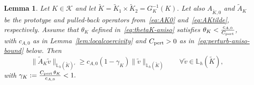 \documentclass[a4paper,twoside,10pt]{article}
\newtheorem{lemma}[theorem]{Lemma}
\newcommand{\AKO}{{A_{\tilde K,0}}}
\newcommand{\calK}{\mathcal{K}}
\numberwithin{equation}{section}
\newcommand{\Kt}{\widetilde{K}}
\begin{document}
	\begin{lemma}\label{lem:perturb-bent-aniso}
	Let $K\in\calK$ and let $\Kt=\Kt_1\times \Kt_2=G_K^{-1}(K)$.
	Let also $\AKO$ and $\widetilde A_K$ be the prototype and pulled-back operators from~\eqref{eq:AK0} and~\eqref{eq:AKtilde}, respectively. 
	Assume that  $\theta_K$ defined in~\eqref{eq:thetaK-aniso} satisfies
	$ \theta_K<\frac{c_{A,0}}{C_{\rm pert}}$, 	
		with  $c_{A,0}$ as in Lemma~\ref{lem:localcoercivity} and $C_{\rm pert}>0$ 
        as in~\eqref{eq:perturb-aniso-bound} below.
	Then
	\begin{equation*}
	\|\widetilde A_K \tilde v\|_{\mathbb L_h(\Kt)'}
	\ge
	c_{A,0}(1-\gamma_K)\|\tilde v\|_{\mathbb L_h(\Kt)}
	\qquad\forall \tilde v\in\mathbb L_h(\Kt),
	\end{equation*}
	with
	$ \gamma_K:=\frac{C_{\rm pert}\,\theta_K}{c_{A,0}}<1.$
	\end{lemma}
\end{document}
